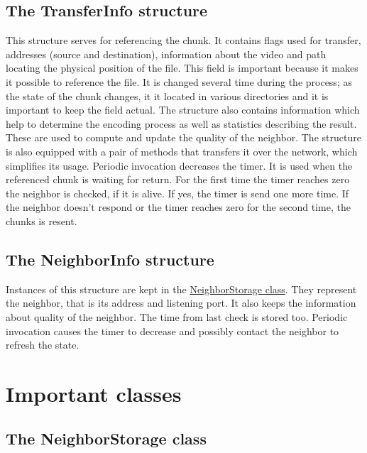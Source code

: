\subsection{The TransferInfo
structure}\label{the-transferinfo-structure}

This structure serves for referencing the chunk. It contains flags used
for transfer, addresses (source and destination), information about the
video and path locating the physical position of the file. This field is
important because it makes it possible to reference the file. It is
changed several time during the process; as the state of the chunk
changes, it it located in various directories and it is important to
keep the field actual. The structure also contains information which
help to determine the encoding process as well as statistics describing
the result. These are used to compute and update the quality of the
neighbor. The structure is also equipped with a pair of methods that
transfers it over the network, which simplifies its usage. Periodic
invocation decreases the timer. It is used when the referenced chunk is
waiting for return. For the first time the timer reaches zero the
neighbor is checked, if it is alive. If yes, the timer is send one more
time. If the neighbor doesn't respond or the timer reaches zero for the
second time, the chunks is resent.

\subsection{The NeighborInfo
structure}\label{the-neighborinfo-structure}

Instances of this structure are kept in the
\hyperref[neighborstorage]{NeighborStorage class}. They represent the
neighbor, that is its address and listening port. It also keeps the
information about quality of the neighbor. The time from last check is
stored too. Periodic invocation causes the timer to decrease and
possibly contact the neighbor to refresh the state.

\section{Important classes}\label{important-classes}

\subsection{The NeighborStorage class}\label{the-neighborstorage-class}

